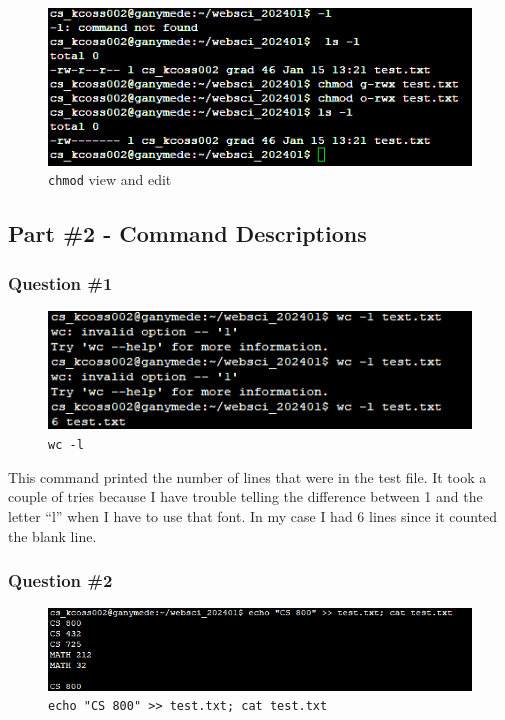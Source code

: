 \documentclass[
]{article}
\begin{document}
\begin{figure}
\centering
\includegraphics{linux_cmd_permissions.png}
\caption{\texttt{chmod} view and edit}
\end{figure}

\hypertarget{part-2---command-descriptions}{%
\subsection{\texorpdfstring{\textbf{Part \#2 - Command
Descriptions}}{Part \#2 - Command Descriptions}}\label{part-2---command-descriptions}}

\hypertarget{question-1}{%
\subsubsection{Question \#1}\label{question-1}}

\begin{figure}
\centering
\includegraphics{linux_cmd_1_wcb.png}
\caption{\texttt{wc\ -l}}
\end{figure}

This command printed the number of lines that were in the test file. It
took a couple of tries because I have trouble telling the difference
between 1 and the letter ``l'' when I have to use that font. In my case
I had 6 lines since it counted the blank line.

\hypertarget{question-2}{%
\subsubsection{Question \#2}\label{question-2}}

\begin{figure}
\centering
\includegraphics{linux_cmd_2_echo.png}
\caption{\texttt{echo\ "CS\ 800"\ \textgreater{}\textgreater{}\ test.txt;\ cat\ test.txt}}
\end{figure}
\end{document}
